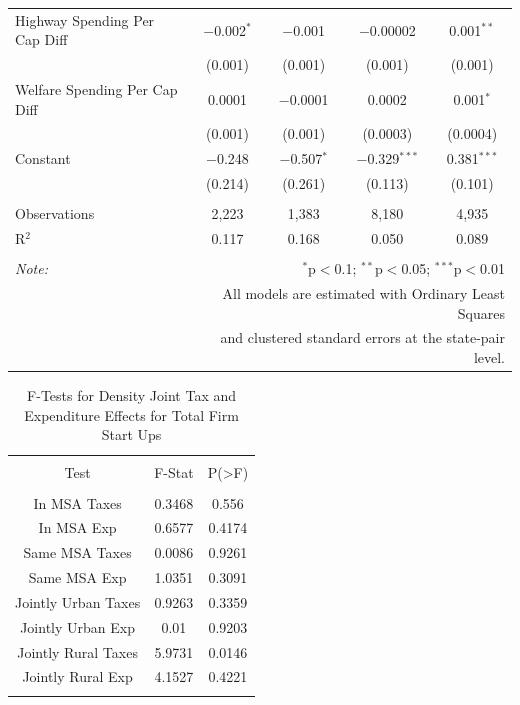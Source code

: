\documentclass[12pt,a4paper]{article}
\begin{document}
\begin{table}[!htbp]
\begin{tabular}{@{\extracolsep{5pt}}lcccc}
  Highway Spending Per Cap Diff & $-$0.002$^{*}$ & $-$0.001 & $-$0.00002 & 0.001$^{**}$ \\ 
  & (0.001) & (0.001) & (0.001) & (0.001) \\ 
  Welfare Spending Per Cap Diff & 0.0001 & $-$0.0001 & 0.0002 & 0.001$^{*}$ \\ 
  & (0.001) & (0.001) & (0.0003) & (0.0004) \\ 
  Constant & $-$0.248 & $-$0.507$^{*}$ & $-$0.329$^{***}$ & 0.381$^{***}$ \\ 
  & (0.214) & (0.261) & (0.113) & (0.101) \\ 
 \hline \\[-1.8ex] 
Observations & 2,223 & 1,383 & 8,180 & 4,935 \\ 
R$^{2}$ & 0.117 & 0.168 & 0.050 & 0.089 \\ 
\hline 
\hline \\[-1.8ex] 
\textit{Note:}  & \multicolumn{4}{r}{$^{*}$p$<$0.1; $^{**}$p$<$0.05; $^{***}$p$<$0.01} \\ 
 & \multicolumn{4}{r}{All models are estimated with Ordinary Least Squares} \\ 
 & \multicolumn{4}{r}{and clustered standard errors at the state-pair level.} \\ 
\end{tabular} 
\end{table} 



\begin{table}[!htbp] \centering 
  \caption{F-Tests for Density Joint Tax and Expenditure Effects for Total Firm Start Ups} 
  \label{--Ftests} 
\begin{tabular}{@{\extracolsep{5pt}} ccc} 
\\[-1.8ex]\hline 
\hline \\[-1.8ex] 
Test & F-Stat & P(\textgreater F) \\ 
\hline \\[-1.8ex] 
In MSA Taxes & 0.3468 & 0.556 \\ 
In MSA Exp & 0.6577 & 0.4174 \\ 
Same MSA Taxes & 0.0086 & 0.9261 \\ 
Same MSA Exp & 1.0351 & 0.3091 \\ 
Jointly Urban Taxes & 0.9263 & 0.3359 \\ 
Jointly Urban Exp & 0.01 & 0.9203 \\ 
Jointly Rural Taxes & 5.9731 & 0.0146 \\ 
Jointly Rural Exp & 4.1527 & 0.4221 \\ 
\hline \\[-1.8ex] 
\end{tabular} 
\end{table} 
\end{document}
